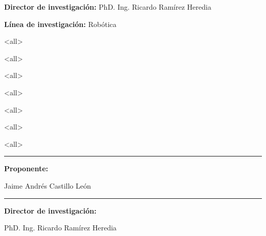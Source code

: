 \renewcommand{\tablename}{Tabla}

\maketitle
{}
{\large\textbf{Director de investigaci\'on:} PhD. Ing. Ricardo Ram\'irez Heredia}\par\vspace{0.7cm}
{\large\textbf{L\'inea de investigaci\'on:} Rob\'otica}

\mode<all>

\mode<all>

\mode<all>

\mode<all>

\mode<all>

\mode<all>

\mode<all>

\mode*

\vspace{2cm}

\vspace{4cm}
\parbox[b][3cm][c]{8cm}{
\centering
\rule{7cm}{1pt}\par
\textbf{Proponente:}\par
Jaime Andr\'es Castillo Le\'on
}\par\vspace{3cm}
\parbox[b][3cm][c]{8cm}{
\centering
\rule{7cm}{1pt}\par
\textbf{Director de investigaci\'on:}\par
PhD. Ing. Ricardo Ram\'irez Heredia
}


